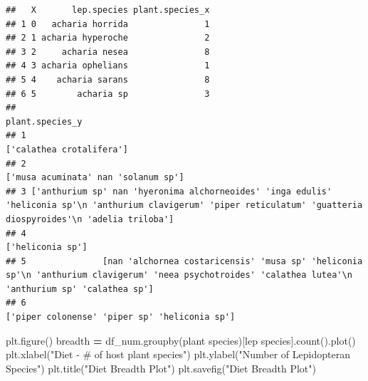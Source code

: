 \documentclass[
]{article}
\newenvironment{Shaded}{\begin{snugshade}}{\end{snugshade}}
\newcommand{\NormalTok}[1]{#1}
\newcommand{\OperatorTok}[1]{\textcolor[rgb]{0.81,0.36,0.00}{\textbf{#1}}}
\newcommand{\StringTok}[1]{\textcolor[rgb]{0.31,0.60,0.02}{#1}}
\begin{document}
\begin{verbatim}
##   X       lep.species plant.species_x
## 1 0   acharia horrida               1
## 2 1 acharia hyperoche               2
## 3 2     acharia nesea               8
## 4 3 acharia ophelians               1
## 5 4    acharia sarans               8
## 6 5        acharia sp               3
##                                                                                                                                                        plant.species_y
## 1                                                                                                                                             ['calathea crotalifera']
## 2                                                                                                                                  ['musa acuminata' nan 'solanum sp']
## 3 ['anthurium sp' nan 'hyeronima alchorneoides' 'inga edulis' 'heliconia sp'\n 'anthurium clavigerum' 'piper reticulatum' 'guatteria diospyroides'\n 'adelia triloba']
## 4                                                                                                                                                     ['heliconia sp']
## 5               [nan 'alchornea costaricensis' 'musa sp' 'heliconia sp'\n 'anthurium clavigerum' 'neea psychotroides' 'calathea lutea'\n 'anthurium sp' 'calathea sp']
## 6                                                                                                                        ['piper colonense' 'piper sp' 'heliconia sp']
\end{verbatim}

\begin{Shaded}
\begin{Highlighting}[]
\NormalTok{plt.figure()}
\NormalTok{breadth }\OperatorTok{=}\NormalTok{ df\_num.groupby(}\StringTok{\textquotesingle{}plant species\textquotesingle{}}\NormalTok{)[}\StringTok{\textquotesingle{}lep species\textquotesingle{}}\NormalTok{].count().plot()}
\NormalTok{plt.xlabel(}\StringTok{"Diet {-} \# of host plant species"}\NormalTok{)}
\NormalTok{plt.ylabel(}\StringTok{"Number of Lepidopteran Species"}\NormalTok{)}
\NormalTok{plt.title(}\StringTok{"Diet Breadth Plot"}\NormalTok{)}
\NormalTok{plt.savefig(}\StringTok{"Diet Breadth Plot"}\NormalTok{)}
\end{Highlighting}
\end{Shaded}
\end{document}
